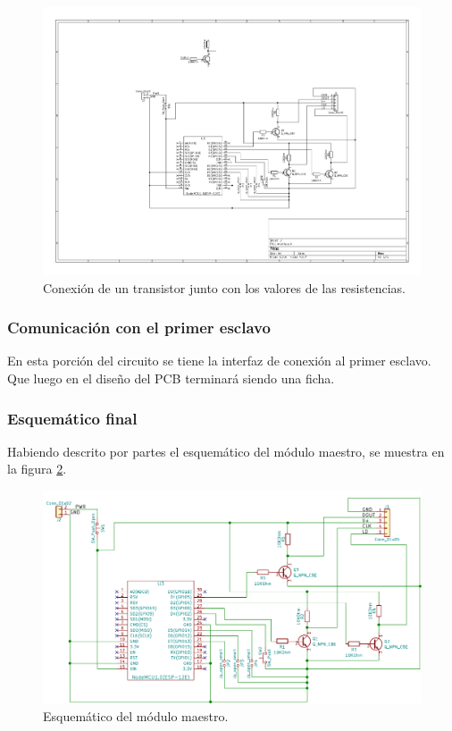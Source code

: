 \begin{figure}[ht!]
	\centering
	\begin{center}
		\includegraphics[scale=2]{imagenes/hw/transistor.pdf}
		\caption{Conexión de un transistor junto con los valores de las resistencias.}
		\label{fig:transistors}
	\end{center}
\end{figure}

\subsubsection{Comunicación con el primer esclavo}
En esta porción del circuito se tiene la interfaz de conexión al primer esclavo. Que luego en el diseño del PCB terminará siendo una ficha.

\subsubsection{Esquemático final}
Habiendo descrito por partes el esquemático del módulo maestro, se muestra en la figura \ref{fig:esquematico-master-anotado}.

\begin{figure}[ht!]
	\centering
	\includegraphics[width=\linewidth]{imagenes/esquematico-master.pdf}
	\caption{Esquemático del módulo maestro.}
	\label{fig:esquematico-master-anotado}
\end{figure}


